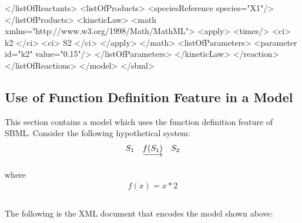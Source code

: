 \documentclass[10pt,twocolumntoc]{cekarticle}
\begin{document}
\begin{example}
                </listOfReactants>
                <listOfProducts>
                    <speciesReference species="X1"/>
                </listOfProducts>
                <kineticLaw>
                    <math xmlns="http://www.w3.org/1998/Math/MathML">
                        <apply>
                            <times/>
                            <ci> k2 </ci>
                            <ci> S2 </ci>
                        </apply>
                    </math>
                    <listOfParameters>
                        <parameter id="k2" value="0.15"/>
                    </listOfParameters>
                </kineticLaw>
            </reaction>
        </listOfReactions>
    </model>
</sbml>
\end{example}

\subsection{Use of Function Definition Feature in a Model}
\label{sec:functioneg}

This section contains a model which uses the function definition
feature of SBML.  Consider the following hypothetical system:
\begin{equation*}
  \begin{array}{@{}ccc@{}}
    S_1 & \underrightarrow{f(S_1)} & S_2 \\ \\[-4pt]
  \end{array}
\end{equation*}
where
\begin{equation*}
  \begin{array}{l}
    f(x) = x * 2 \\ \\[-4pt]
  \end{array}
\end{equation*}

The following is the XML document that encodes the model shown
above:
\end{document}
